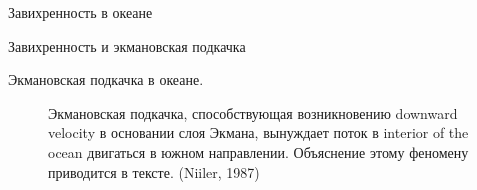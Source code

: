 \begin{chapter}{Завихренность в океане}
\begin{section}{Завихренность и экмановская подкачка}
\begin{paragraph}{Экмановская подкачка в океане.}
\begin{figure}[t]
\caption{Экмановская подкачка, способствующая 
возникновению downward velocity в основании слоя Экмана, 
вынуждает поток в interior of the ocean двигаться в южном направлении. 
Объяснение этому феномену приводится в тексте.
(Niiler, 1987) } 
\label{fig:vorticity}
\vfill
\vspace{-3ex}
\end{figure}
\end{paragraph}
%
%


\end{section}
\end{chapter}
